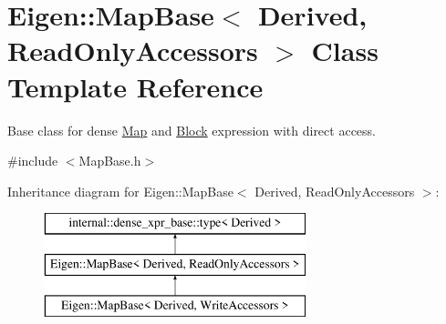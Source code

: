 \hypertarget{class_eigen_1_1_map_base_3_01_derived_00_01_read_only_accessors_01_4}{}\section{Eigen\+::Map\+Base$<$ Derived, Read\+Only\+Accessors $>$ Class Template Reference}
\label{class_eigen_1_1_map_base_3_01_derived_00_01_read_only_accessors_01_4}


Base class for dense \mbox{\hyperlink{class_eigen_1_1_map}{Map}} and \mbox{\hyperlink{class_eigen_1_1_block}{Block}} expression with direct access.  




{\ttfamily \#include $<$Map\+Base.\+h$>$}

Inheritance diagram for Eigen\+::Map\+Base$<$ Derived, Read\+Only\+Accessors $>$\+:\begin{figure}[H]
\begin{center}
\leavevmode
\includegraphics[height=3.000000cm]{class_eigen_1_1_map_base_3_01_derived_00_01_read_only_accessors_01_4}
\end{center}
\end{figure}
